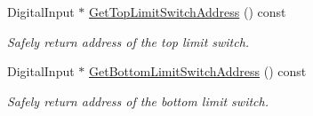\begin{DoxyCompactItemize}
DigitalInput $\ast$ \hyperlink{class_r_j_f_r_c2011_1_1_manipulator_afd80093f2952e34947504efe7d5f430b}{GetTopLimitSwitchAddress} () const 
\begin{DoxyCompactList}\small\item\em Safely return address of the top limit switch. \item\end{DoxyCompactList}\item 
DigitalInput $\ast$ \hyperlink{class_r_j_f_r_c2011_1_1_manipulator_ab2ed70a0fab961a27e468454948b6917}{GetBottomLimitSwitchAddress} () const 
\begin{DoxyCompactList}\small\item\em Safely return address of the bottom limit switch. \item\end{DoxyCompactList}\end{DoxyCompactItemize}
